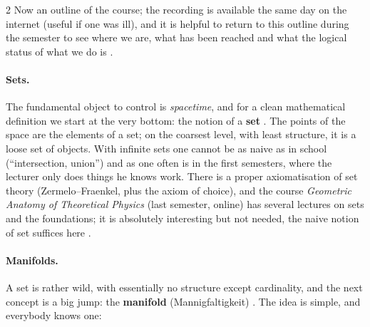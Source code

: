 \begin{paracol}{2}
Now an outline of the course; the recording is available the same day on the internet (useful if one was ill), and it
is helpful to return to this outline during the semester to see where we are, what has been reached and what the
logical status of what we do is .

\paragraph{Sets.} The fundamental object to control is \emph{spacetime}, and for a clean mathematical definition we start
at the very bottom: the notion of a \textbf{set} . The points of the
space are the elements of a set; on the coarsest level, with least structure, it is a loose set of objects. With
infinite sets one cannot be as naive as in school (``intersection, union'') and as one often is in the first
semesters, where the lecturer only does things he knows work. There is a proper axiomatisation of set theory
(Zermelo--Fraenkel, plus the axiom of choice), and the course \emph{Geometric Anatomy of Theoretical Physics}
(last semester, online) has several lectures on sets and the foundations; it is absolutely interesting but not needed,
the naive notion of set suffices here .

\paragraph{Manifolds.} A set is rather wild, with essentially no structure except cardinality, and the next concept is a
big jump: the \textbf{manifold} (Mannigfaltigkeit) . The idea is
simple, and everybody knows one:


\end{paracol}
